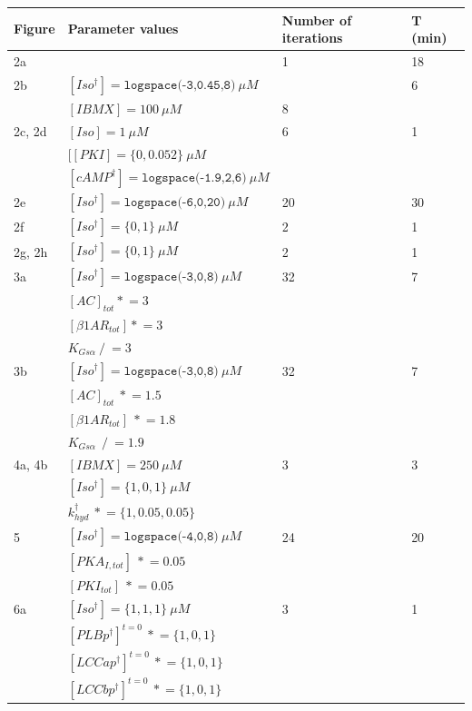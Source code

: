 \documentclass[fleqn,10pt]{physiome}
\newcommand{\asteq}{\mathrel{*}=}
\newcommand{\diveq}{\mathrel{/}=}
\begin{document}
\begin{table}
\begin{tabular}{|l|l|l|l|}
\hline
Figure & Parameter values & Number of iterations & T (min)  \\ 
\hline
2a &  & 1 & 18 \\ 
\hline
2b & $[Iso^\dagger] = \texttt{logspace(-3,0.45,8)}\ \mu M$ & & 6 \\ 
 & $[IBMX] = 100\ \mu M$ & 8 & \\ 
\hline
2c, 2d & $[Iso] = 1\ \mu M$ & 6 & 1 \\ 
 & $[[PKI] = \{0, 0.052\}\ \mu M$ & & \\
 & $[cAMP^\dagger] = \texttt{logspace(-1.9,2,6)}\ \mu M$ & & \\
\hline
2e & $[Iso^\dagger] = \texttt{logspace(-6,0,20)}\ \mu M$ & 20 & 30 \\ \hline
2f & $[Iso^\dagger] = \{0, 1\}\ \mu M$ & 2 & 1 \\
\hline
2g, 2h & $[Iso^\dagger] = \{0, 1\}\ \mu M$ & 2 & 1 \\
\hline
3a & $[Iso^\dagger] = \texttt{logspace(-3,0,8)}\ \mu M$ & 32 & 7 \\
& $[AC]_{tot} \asteq 3$  &  & \\
 &  $[\beta1AR_{tot}] \asteq 3$  &  & \\
 &  $K_{Gs\alpha } \diveq 3$ &  & \\
\hline
3b & $[Iso^\dagger] = \texttt{logspace(-3,0,8)}\ \mu M$ & 32 & 7 \\
& $[AC]_{tot}\ \asteq 1.5$  & & \\
 &  $[\beta1AR_{tot}]\ \asteq 1.8$  & & \\
 &  $K_{Gs\alpha }\ \diveq 1.9$ & & \\
\hline
4a, 4b & $[IBMX] = 250\ \mu M$ & 3 & 3 \\
& $[Iso^\dagger] = \{1,0,1\}\ \mu M$ &  &  \\
& $k_{hyd}^\dagger\ \asteq \{1,0.05,0.05\}\ $ &  &  \\
\hline
5 & $[Iso^\dagger] = \texttt{logspace(-4,0,8)}\ \mu M$ & 24 & 20 \\
& $[PKA_{I,tot}]\ \asteq0.05$ & & \\
& $[PKI_{tot}]\ \asteq0.05$ & & \\
\hline
6a & $[Iso^\dagger] = \{1,1,1\}\ \mu M$ & 3 & 1 \\
& $[PLBp^\dagger]^{t=0} \ \asteq \{1,0,1\}$ & & \\
& $[LCCap^\dagger]^{t=0} \ \asteq \{1,0,1\}$ & & \\
& $[LCCbp^\dagger]^{t=0} \ \asteq \{1,0,1\}$ & & \\

\end{tabular}
\end{table}
\end{document}
